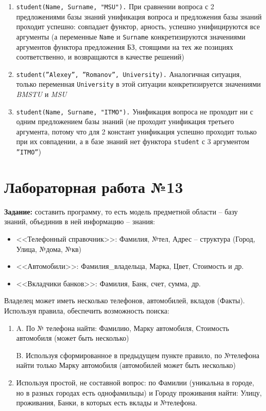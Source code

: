 \begin{enumerate}
    \item \texttt{student(Name, Surname, "MSU").}
        При сравнении вопроса с 2 предложениями базы знаний унификация вопроса и предложения базы знаний проходит успешно: совпадает функтор, арность, успешно унифицируются все аргументы (а переменные \texttt{Name} и \texttt{Surname} конкретизируются значениями аргументов функтора предложения БЗ, стоящими на тех же позициях соответственно, и возвращаются в качестве решений)
    \item \texttt{student(''Alexey'', ''Romanov'', University).}
        Аналогичная ситуация, только переменная \texttt{University} в этой ситуации конкретизируется значениями \textit{BMSTU} и \textit{MSU}
    \item \texttt{student(Name, Surname, "ITMO").}
        Унификация вопроса не проходит ни с одним предложением базы знаний (не проходит унификация третьего аргумента, потому что для 2 констант унификация успешно проходит только при их совпадении, а в базе знаний нет функтора \texttt{student} с 3 аргументом \texttt{''ITMO''})
\end{enumerate}

\chapter{Лабораторная работа №13}

\textbf{Задание:} составить программу, то есть модель предметной области – базу знаний, объединив в ней информацию – знания:

\begin{itemize}
    \item <<Телефонный справочник>>: Фамилия, №тел, Адрес – структура (Город, Улица, №дома, №кв)
    \item <<Автомобили>>: Фамилия\_владельца, Марка, Цвет, Стоимость и др.
    \item <<Вкладчики банков>>: Фамилия, Банк, счет, сумма, др.
\end{itemize}


Владелец может иметь несколько телефонов, автомобилей, вкладов (Факты).
Используя правила, обеспечить возможность поиска:


\begin{enumerate}
    \item A. По № телефона найти: Фамилию, Марку автомобиля, Стоимость автомобиля (может быть несколько)

        B. Используя сформированное в предыдущем пункте правило, по №телефона найти только Марку автомобиля (автомобилей может быть несколько)

    \item Используя простой, не составной вопрос: по Фамилии (уникальна в городе, но в разных городах есть однофамильцы) и Городу проживания найти: Улицу, проживания, Банки, в которых есть вклады и №телефона.
\end{enumerate}

